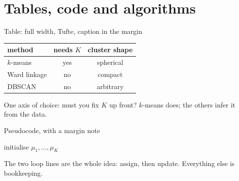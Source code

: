 \documentclass[aspectratio=169]{beamer}
\begin{document}
\section{Tables, code and algorithms}

\begin{frame}{Table: full width, Tufte, caption in the margin}
  \begin{withmargin}
    \begin{tdmain}
      \renewcommand{\arraystretch}{1.3}%
      {%
      \begin{tabularx}{\linewidth}{@{}Xcc@{}}
        \toprule
        method & needs $K$ & cluster shape \\
        \midrule
        \textcolor{DHBWred}{$k$-means} & yes & spherical \\
        Ward linkage     & no  & compact \\
        DBSCAN           & no  & arbitrary \\
        \bottomrule
      \end{tabularx}}
    \end{tdmain}
    \begin{tdmargin}
      One axis of choice: must you fix $K$ up front? \textcolor{DHBWred}{$k$-means}
      does; the others infer it from the data.
    \end{tdmargin}
  \end{withmargin}
\end{frame}

\begin{frame}{Pseudocode, with a margin note}
  \begin{withmargin}
    \begin{tdmain}
      \begin{algorithm}[H]
        \DontPrintSemicolon
        initialise $\mu_1,\dots,\mu_K$\;
        \caption{Lloyd's algorithm for $k$-means}
      \end{algorithm}
    \end{tdmain}
    \begin{tdmargin}
      The two loop lines are the whole idea: \textcolor{DHBWred}{assign}, then
      update. Everything else is bookkeeping.
    \end{tdmargin}
  \end{withmargin}
\end{frame}
\end{document}
